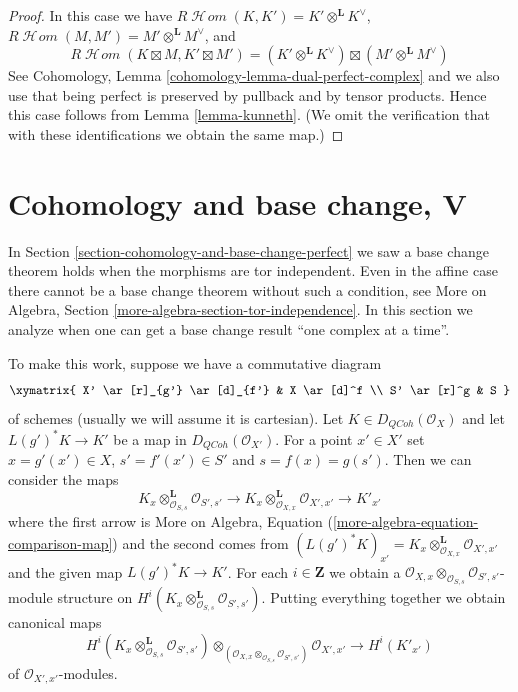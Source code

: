 \documentclass{stacks-project}
\theoremstyle{plain}
\theoremstyle{definition}
\theoremstyle{remark}
\numberwithin{equation}{subsection}
\def\SheafHom{\mathop{\mathcal{H}\!\mathit{om}}\nolimits}
\def\QCoh{\mathit{QCoh}}
\begin{document}
\begin{proof}
In this case we have $R\SheafHom(K, K') = K' \otimes^\mathbf{L} K^\vee$,
$R\SheafHom(M, M') = M' \otimes^\mathbf{L} M^\vee$, and
$$
R\SheafHom(K \boxtimes M, K' \boxtimes M') =
(K' \otimes^\mathbf{L} K^\vee) \boxtimes
(M' \otimes^\mathbf{L} M^\vee)
$$
See Cohomology, Lemma \ref{cohomology-lemma-dual-perfect-complex}
and we also use that being perfect is preserved by pullback
and by tensor products.
Hence this case follows from Lemma \ref{lemma-kunneth}.
(We omit the verification that with these identifications
we obtain the same map.)
\end{proof}








\section{Cohomology and base change, V}
\label{section-cohomology-base-change}

\noindent
In Section \ref{section-cohomology-and-base-change-perfect}
we saw a base change theorem holds when the morphisms are tor independent.
Even in the affine case there cannot be a base change theorem without such
a condition, see
More on Algebra, Section \ref{more-algebra-section-tor-independence}.
In this section we analyze when one can get a base change result
``one complex at a time''.

\medskip\noindent
To make this work, suppose we have a commutative diagram
$$
\xymatrix{
X' \ar[r]_{g'} \ar[d]_{f'} &
X \ar[d]^f \\
S' \ar[r]^g &
S
}
$$
of schemes (usually we will assume it is cartesian).
Let $K \in D_\QCoh(\mathcal{O}_X)$
and let $L(g')^*K \to K'$ be a map in $D_\QCoh(\mathcal{O}_{X'})$.
For a point $x' \in X'$ set $x = g'(x') \in X$,
$s' = f'(x') \in S'$ and $s = f(x) = g(s')$.
Then we can consider the maps
$$
K_x \otimes_{\mathcal{O}_{S, s}}^\mathbf{L} \mathcal{O}_{S', s'} \to
K_x \otimes_{\mathcal{O}_{X, x}}^\mathbf{L} \mathcal{O}_{X', x'} \to
K'_{x'}
$$
where the first arrow is More on Algebra,
Equation (\ref{more-algebra-equation-comparison-map})
and the second comes from
$(L(g')^*K)_{x'} =
K_x \otimes_{\mathcal{O}_{X, x}}^\mathbf{L} \mathcal{O}_{X', x'}$
and the given map $L(g')^*K \to K'$.
For each $i \in \mathbf{Z}$ we obtain a
$\mathcal{O}_{X, x} \otimes_{\mathcal{O}_{S, s}} \mathcal{O}_{S', s'}$-module
structure on
$H^i(K_x \otimes_{\mathcal{O}_{S, s}}^\mathbf{L} \mathcal{O}_{S', s'})$.
Putting everything together we obtain canonical maps
\begin{equation}
\label{equation-bc}
H^i(K_x \otimes_{\mathcal{O}_{S, s}}^\mathbf{L} \mathcal{O}_{S', s'})
\otimes_{(\mathcal{O}_{X, x} \otimes_{\mathcal{O}_{S, s}} \mathcal{O}_{S', s'})}
\mathcal{O}_{X', x'}
\longrightarrow
H^i(K'_{x'})
\end{equation}
of $\mathcal{O}_{X', x'}$-modules.
\end{document}
